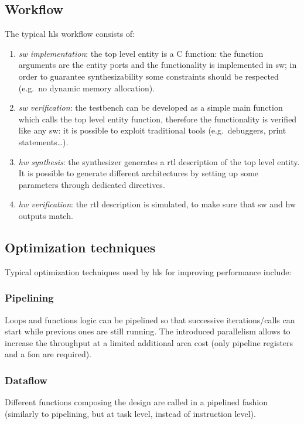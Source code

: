 \documentclass[11pt,a4paper,oneside]{memoir}
\begin{document}
\subsection{Workflow}
The typical \ac{hls} workflow consists of:
\begin{enumerate}
	\item \emph{\ac{sw} implementation}: the top level entity is a C
		function: the function arguments are the entity ports and the
		functionality is implemented in \ac{sw}; in order to guarantee
		synthesizability some constraints should be respected (e.g.\ no
		dynamic memory allocation).
	\item \emph{\ac{sw} verification}: the testbench can be developed as a
		simple main function which calls the top level entity function,
		therefore the functionality is verified like any \ac{sw}: it is
		possible to exploit traditional tools (e.g.\ debuggers, print
		statements\ldots).
	\item \emph{\ac{hw} synthesis}: the synthesizer generates a \ac{rtl}
		description of the top level entity. It is possible to generate
		different architectures by setting up some parameters through
		dedicated directives.
	\item \emph{\ac{hw} verification}: the \ac{rtl} description is
		simulated, to make sure that \ac{sw} and \ac{hw} outputs match.
\end{enumerate}

\subsection{Optimization techniques}
Typical optimization techniques used by \ac{hls} for improving performance
include:
\subsubsection{Pipelining}
Loops and functions logic can be pipelined so that successive iterations/calls
can start while previous ones are still running. The introduced parallelism
allows to increase the throughput at a limited additional area cost (only
pipeline registers and a \acs{fsm} are required).

\subsubsection{Dataflow}
Different functions composing the design are called in a pipelined fashion
(similarly to pipelining, but at task level, instead of instruction level).
\end{document}
